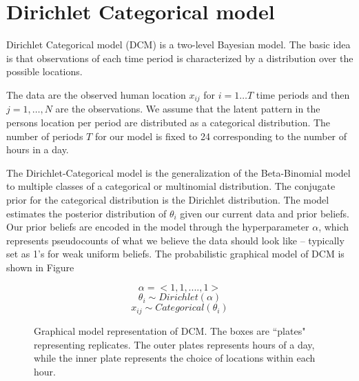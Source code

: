 \documentclass[11pt]{report}
\begin{document}
\section{Dirichlet Categorical model }

Dirichlet Categorical model (DCM) is a two-level Bayesian model. The basic idea is that observations of each time period is characterized by a distribution over the possible locations.

The data are the observed human location $x_{ij}$ for $i = 1 \dots T$ time periods and then $j = 1, \dots , N$  are the observations.  We assume that the latent pattern in the persons location per period are distributed as a categorical distribution. The number of periods $T$ for our model is fixed to 24 corresponding to the number of hours in a day. 

The Dirichlet-Categorical model is the generalization of the Beta-Binomial model to multiple classes of a categorical or multinomial distribution. The conjugate prior for the categorical distribution is the Dirichlet distribution. The model estimates the posterior distribution of $\theta_i$ given our current data and prior beliefs. Our prior beliefs are encoded in the model through the hyperparameter $\alpha$, which represents pseudocounts of what we believe the data should look like – typically set as 1's for weak uniform beliefs. The probabilistic graphical model of  DCM is shown in Figure \cite{dcm}

\noindent
\begin{figure}[htp]

\begin{minipage}{0.3\textwidth}
\centering


\end{minipage}%
\begin{minipage}{0.7\textwidth}

\begin{equation*}
	\alpha = <1, 1, .... , 1 > 
\end{equation*}
\begin{equation*}
	\theta_i  \sim Dirichlet(\alpha)
\end{equation*}
\begin{equation*}
	x_{ij} \sim Categorical(\theta_i)
\end{equation*}
\end{minipage}
\caption{Graphical model representation of DCM. The boxes are ``plates" representing replicates. The outer plates represents hours of a day, while the inner plate represents the choice of locations within each hour.}
\label{dcm}
\end{figure}
\end{document}
